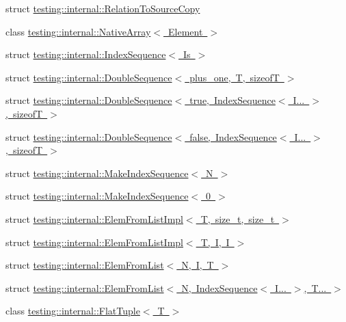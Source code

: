 \begin{DoxyCompactItemize}
\item 
struct \mbox{\hyperlink{structtesting_1_1internal_1_1_relation_to_source_copy}{testing\+::internal\+::\+Relation\+To\+Source\+Copy}}
\item 
class \mbox{\hyperlink{classtesting_1_1internal_1_1_native_array}{testing\+::internal\+::\+Native\+Array$<$ Element $>$}}
\item 
struct \mbox{\hyperlink{structtesting_1_1internal_1_1_index_sequence}{testing\+::internal\+::\+Index\+Sequence$<$ Is $>$}}
\item 
struct \mbox{\hyperlink{structtesting_1_1internal_1_1_double_sequence}{testing\+::internal\+::\+Double\+Sequence$<$ plus\+\_\+one, T, sizeof\+T $>$}}
\item 
struct \mbox{\hyperlink{structtesting_1_1internal_1_1_double_sequence_3_01true_00_01_index_sequence_3_01_i_8_8_8_01_4_00_01sizeof_t_01_4}{testing\+::internal\+::\+Double\+Sequence$<$ true, Index\+Sequence$<$ I... $>$, sizeof\+T $>$}}
\item 
struct \mbox{\hyperlink{structtesting_1_1internal_1_1_double_sequence_3_01false_00_01_index_sequence_3_01_i_8_8_8_01_4_00_01sizeof_t_01_4}{testing\+::internal\+::\+Double\+Sequence$<$ false, Index\+Sequence$<$ I... $>$, sizeof\+T $>$}}
\item 
struct \mbox{\hyperlink{structtesting_1_1internal_1_1_make_index_sequence}{testing\+::internal\+::\+Make\+Index\+Sequence$<$ N $>$}}
\item 
struct \mbox{\hyperlink{structtesting_1_1internal_1_1_make_index_sequence_3_010_01_4}{testing\+::internal\+::\+Make\+Index\+Sequence$<$ 0 $>$}}
\item 
struct \mbox{\hyperlink{structtesting_1_1internal_1_1_elem_from_list_impl}{testing\+::internal\+::\+Elem\+From\+List\+Impl$<$ T, size\+\_\+t, size\+\_\+t $>$}}
\item 
struct \mbox{\hyperlink{structtesting_1_1internal_1_1_elem_from_list_impl_3_01_t_00_01_i_00_01_i_01_4}{testing\+::internal\+::\+Elem\+From\+List\+Impl$<$ T, I, I $>$}}
\item 
struct \mbox{\hyperlink{structtesting_1_1internal_1_1_elem_from_list}{testing\+::internal\+::\+Elem\+From\+List$<$ N, I, T $>$}}
\item 
struct \mbox{\hyperlink{structtesting_1_1internal_1_1_elem_from_list_3_01_n_00_01_index_sequence_3_01_i_8_8_8_01_4_00_01_t_8_8_8_01_4}{testing\+::internal\+::\+Elem\+From\+List$<$ N, Index\+Sequence$<$ I... $>$, T... $>$}}
\item 
class \mbox{\hyperlink{classtesting_1_1internal_1_1_flat_tuple}{testing\+::internal\+::\+Flat\+Tuple$<$ T $>$}}

\end{DoxyCompactItemize}
